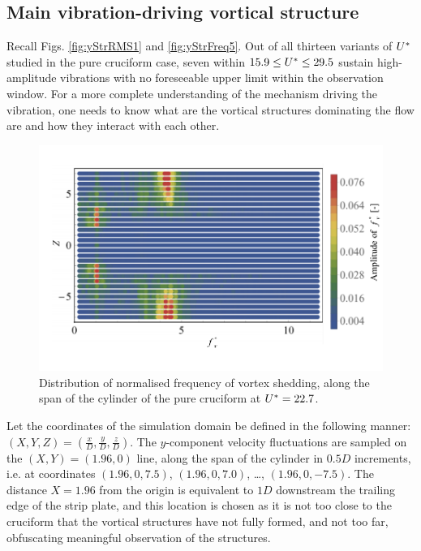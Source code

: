 \documentclass[oneside]{utmthesis}
\begin{document}
\subsection{Main vibration-driving vortical structure}\label{ssec:svivRegimeVortStruct}
Recall Figs. \ref{fig:yStrRMS1} and \ref{fig:yStrFreq5}. Out of all thirteen variants of $U^{*}$ studied in the pure cruciform case, seven within $15.9 \leq U^{*} \leq 29.5$ sustain high-amplitude vibrations with no foreseeable upper limit within the observation window. For a more complete understanding of the mechanism driving the vibration, one needs to know what are the vortical structures dominating the flow are and how they interact with each other.

\begin{figure}
  \centering
\includegraphics[width=1\textwidth]{figs/probe90YU10}
\caption{Distribution of normalised frequency of vortex shedding, along the span of the cylinder of the pure cruciform at $U^{*} = 22.7$.}
  \label{fig:probe90YU10}
\end{figure}

Let the coordinates of the simulation domain be defined in the following manner: $\left( X, Y, Z \right) = \left( \frac{x}{D}, \frac{y}{D}, \frac{z}{D} \right)$. The $y$-component velocity fluctuations are sampled on the $\left ( X, Y \right ) = \left ( 1.96, 0 \right )$ line, along the span of the cylinder in $0.5D$ increments, i.e. at coordinates $\left ( 1.96, 0, 7.5 \right )$, $\left ( 1.96, 0, 7.0 \right )$, \dots, $\left ( 1.96, 0, -7.5 \right )$. The distance $X = 1.96$ from the origin is equivalent to $1D$ downstream the trailing edge of the strip plate, and this location is chosen as it is not too close to the cruciform that the vortical structures have not fully formed, and not too far, obfuscating meaningful observation of the structures.
\end{document}
